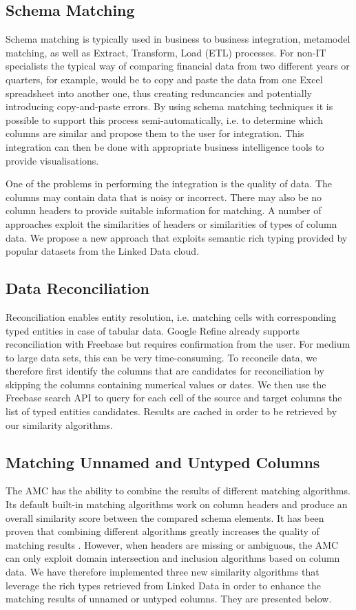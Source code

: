 \documentclass{sig-alternate}
\begin{document}
\subsection{Schema Matching }
Schema matching is typically used in business to business integration, metamodel matching, as well as Extract, Transform, Load (ETL) processes. For non-IT specialists the typical way of comparing financial data from two different years or quarters, for example, would be to copy and paste the data from one Excel spreadsheet into another one, thus creating reduncancies and potentially introducing copy-and-paste errors. By using schema matching techniques it is possible to support this process semi-automatically, i.e. to determine which columns are similar and propose them to the user for integration. This integration can then be done with appropriate business intelligence tools to provide visualisations.

One of the problems in performing the integration is the quality of data. The columns may contain data that is noisy or incorrect. There may also be no column headers to provide suitable information for matching. A number of approaches exploit the similarities of headers or similarities of types of column data. We propose a new approach that exploits semantic rich typing provided by popular datasets from the Linked Data cloud.


\subsection{Data Reconciliation}

Reconciliation enables entity resolution, i.e. matching cells with corresponding typed entities in case of tabular data. Google Refine already supports reconciliation with Freebase but requires confirmation from the user. For medium to large data sets, this can be very time-consuming. To reconcile data, we therefore first identify the columns that are candidates for reconciliation by skipping the columns containing numerical values or dates. We then use the Freebase search API to query for each cell of the source and target columns the list of typed entities candidates. Results are cached in order to be retrieved by our similarity algorithms.


\subsection{Matching Unnamed and Untyped Columns}
The AMC has the ability to combine the results of different matching algorithms. Its default built-in matching algorithms work on column headers and produce an overall similarity score between the compared schema elements. It has been proven that combining different algorithms greatly increases the quality of matching results \cite{conf/icde/PeukertER12}\cite{conf/wise/StracciaT05}. However, when headers are missing or ambiguous, the AMC can only exploit domain intersection and inclusion algorithms based on column data. We have therefore implemented three new similarity algorithms that leverage the rich types retrieved from Linked Data in order to enhance the matching results of unnamed or untyped columns. They are presented below.
\end{document}
